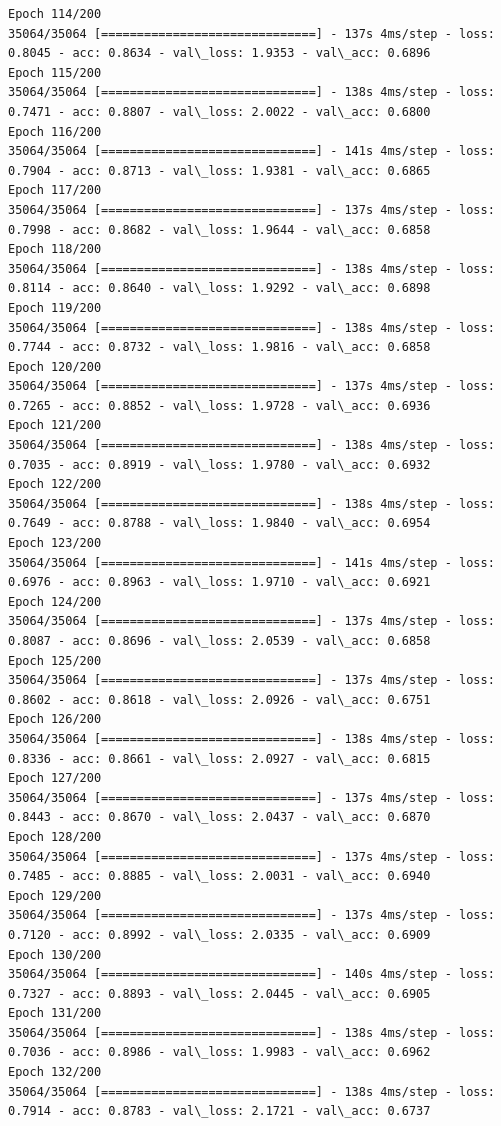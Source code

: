 \documentclass[11pt]{article}
\begin{document}
\begin{Verbatim}[commandchars=\\\{\}]
Epoch 114/200
35064/35064 [==============================] - 137s 4ms/step - loss: 0.8045 - acc: 0.8634 - val\_loss: 1.9353 - val\_acc: 0.6896
Epoch 115/200
35064/35064 [==============================] - 138s 4ms/step - loss: 0.7471 - acc: 0.8807 - val\_loss: 2.0022 - val\_acc: 0.6800
Epoch 116/200
35064/35064 [==============================] - 141s 4ms/step - loss: 0.7904 - acc: 0.8713 - val\_loss: 1.9381 - val\_acc: 0.6865
Epoch 117/200
35064/35064 [==============================] - 137s 4ms/step - loss: 0.7998 - acc: 0.8682 - val\_loss: 1.9644 - val\_acc: 0.6858
Epoch 118/200
35064/35064 [==============================] - 138s 4ms/step - loss: 0.8114 - acc: 0.8640 - val\_loss: 1.9292 - val\_acc: 0.6898
Epoch 119/200
35064/35064 [==============================] - 138s 4ms/step - loss: 0.7744 - acc: 0.8732 - val\_loss: 1.9816 - val\_acc: 0.6858
Epoch 120/200
35064/35064 [==============================] - 137s 4ms/step - loss: 0.7265 - acc: 0.8852 - val\_loss: 1.9728 - val\_acc: 0.6936
Epoch 121/200
35064/35064 [==============================] - 138s 4ms/step - loss: 0.7035 - acc: 0.8919 - val\_loss: 1.9780 - val\_acc: 0.6932
Epoch 122/200
35064/35064 [==============================] - 138s 4ms/step - loss: 0.7649 - acc: 0.8788 - val\_loss: 1.9840 - val\_acc: 0.6954
Epoch 123/200
35064/35064 [==============================] - 141s 4ms/step - loss: 0.6976 - acc: 0.8963 - val\_loss: 1.9710 - val\_acc: 0.6921
Epoch 124/200
35064/35064 [==============================] - 137s 4ms/step - loss: 0.8087 - acc: 0.8696 - val\_loss: 2.0539 - val\_acc: 0.6858
Epoch 125/200
35064/35064 [==============================] - 137s 4ms/step - loss: 0.8602 - acc: 0.8618 - val\_loss: 2.0926 - val\_acc: 0.6751
Epoch 126/200
35064/35064 [==============================] - 138s 4ms/step - loss: 0.8336 - acc: 0.8661 - val\_loss: 2.0927 - val\_acc: 0.6815
Epoch 127/200
35064/35064 [==============================] - 137s 4ms/step - loss: 0.8443 - acc: 0.8670 - val\_loss: 2.0437 - val\_acc: 0.6870
Epoch 128/200
35064/35064 [==============================] - 137s 4ms/step - loss: 0.7485 - acc: 0.8885 - val\_loss: 2.0031 - val\_acc: 0.6940
Epoch 129/200
35064/35064 [==============================] - 137s 4ms/step - loss: 0.7120 - acc: 0.8992 - val\_loss: 2.0335 - val\_acc: 0.6909
Epoch 130/200
35064/35064 [==============================] - 140s 4ms/step - loss: 0.7327 - acc: 0.8893 - val\_loss: 2.0445 - val\_acc: 0.6905
Epoch 131/200
35064/35064 [==============================] - 138s 4ms/step - loss: 0.7036 - acc: 0.8986 - val\_loss: 1.9983 - val\_acc: 0.6962
Epoch 132/200
35064/35064 [==============================] - 138s 4ms/step - loss: 0.7914 - acc: 0.8783 - val\_loss: 2.1721 - val\_acc: 0.6737

\end{Verbatim}
\end{document}
